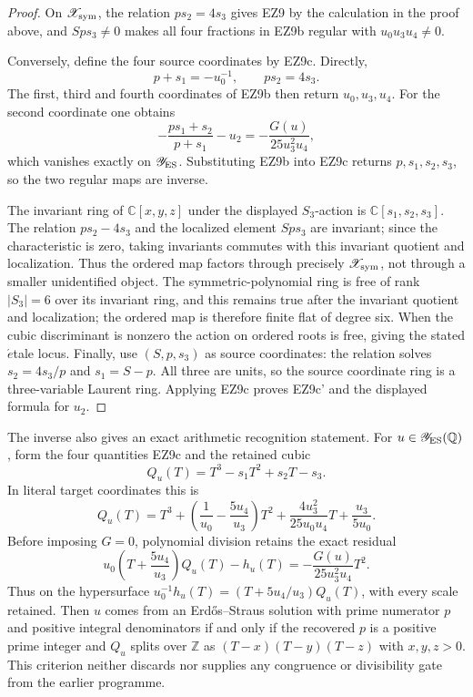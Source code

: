 \documentclass[11pt]{article}
\theoremstyle{definition}\newtheorem{definition}[theorem]{Definition}
\theoremstyle{remark}\newtheorem{remark}[theorem]{Remark}
\begin{document}
\begin{proof}
On \(\mathscr X_{\rm sym}\), the relation \(ps_2=4s_3\) gives EZ9 by
the calculation in the proof above, and \(Sps_3\ne0\) makes all four
fractions in EZ9b regular with \(u_0u_3u_4\ne0\).

Conversely, define the four source coordinates by EZ9c.  Directly,
\[
 p+s_1=-u_0^{-1},\qquad ps_2=4s_3.
\]
The first, third and fourth coordinates of EZ9b then return
\(u_0,u_3,u_4\).  For the second coordinate one obtains
\[
 -\frac{ps_1+s_2}{p+s_1}-u_2
 =-\frac{G(u)}{25u_3^2u_4},
\]
which vanishes exactly on \(\mathscr Y_{\rm ES}\).  Substituting EZ9b
into EZ9c returns \(p,s_1,s_2,s_3\), so the two regular maps are inverse.

The invariant ring of \(\mathbb C[x,y,z]\) under the displayed
\(S_3\)-action is \(\mathbb C[s_1,s_2,s_3]\).  The relation
\(ps_2-4s_3\) and the localized element \(Sps_3\) are invariant; since
the characteristic is zero, taking invariants commutes with this invariant
quotient and localization.  Thus the ordered map factors through precisely
\(\mathscr X_{\rm sym}\), not through a smaller unidentified object.
The symmetric-polynomial ring is free of rank \(|S_3|=6\) over its invariant
ring, and this remains true after the invariant quotient and localization;
the ordered map is therefore finite flat of degree six.  When the cubic
discriminant is nonzero the action on ordered roots is free, giving the stated
\(\acute{e}\)tale locus.  Finally, use \((S,p,s_3)\) as source coordinates:
the relation solves \(s_2=4s_3/p\) and \(s_1=S-p\).  All three are units,
so the source coordinate ring is a three-variable Laurent ring.  Applying
EZ9c proves EZ9c' and the displayed formula for \(u_2\).
\end{proof}

The inverse also gives an exact arithmetic recognition statement.  For
\(u\in\mathscr Y_{\rm ES}(\mathbb Q)\), form the four quantities EZ9c and
the retained cubic
\begin{equation}
 Q_u(T)=T^3-s_1T^2+s_2T-s_3.                           \tag{EZ9d}
\end{equation}
In literal target coordinates this is
\[
 Q_u(T)=T^3+\left(\frac1{u_0}-\frac{5u_4}{u_3}\right)T^2
 +\frac{4u_3^2}{25u_0u_4}T+\frac{u_3}{5u_0}.
\]
Before imposing \(G=0\), polynomial division retains the exact residual
\begin{equation}
 u_0\left(T+\frac{5u_4}{u_3}\right)Q_u(T)-h_u(T)
       =-\frac{G(u)}{25u_3^2u_4}T^2.                  \tag{EZ9d'}
\end{equation}
Thus on the hypersurface
\(u_0^{-1}h_u(T)=(T+5u_4/u_3)Q_u(T)\), with every scale retained.
Then \(u\) comes from an Erd\H{o}s--Straus solution with prime numerator
\(p\) and positive integral denominators if and only if the recovered
\(p\) is a positive prime integer and \(Q_u\) splits over \(\mathbb Z\)
as \((T-x)(T-y)(T-z)\) with \(x,y,z>0\).  This criterion neither discards
nor supplies any congruence or divisibility gate from the earlier programme.
\end{document}
